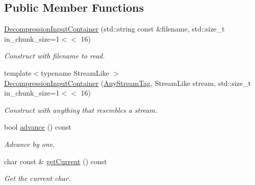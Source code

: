 \subsection*{Public Member Functions}
\begin{DoxyCompactItemize}
\item 
\hyperlink{structvt_1_1util_1_1json_1_1_decompression_input_container_a5cfd1790238964e47e7292ed1ec40548}{Decompression\+Input\+Container} (std\+::string const \&filename, std\+::size\+\_\+t in\+\_\+chunk\+\_\+size=1$<$$<$ 16)
\begin{DoxyCompactList}\small\item\em Construct with filename to read. \end{DoxyCompactList}\item 
{\footnotesize template$<$typename Stream\+Like $>$ }\\\hyperlink{structvt_1_1util_1_1json_1_1_decompression_input_container_a52e3c1f7f8344a77adab88a29251c984}{Decompression\+Input\+Container} (\hyperlink{structvt_1_1util_1_1json_1_1_decompression_input_container_1_1_any_stream_tag}{Any\+Stream\+Tag}, Stream\+Like stream, std\+::size\+\_\+t in\+\_\+chunk\+\_\+size=1$<$$<$ 16)
\begin{DoxyCompactList}\small\item\em Construct with anything that resembles a stream. \end{DoxyCompactList}\item 
bool \hyperlink{structvt_1_1util_1_1json_1_1_decompression_input_container_a7c602c87bed6ca42c1bb2e0a969a922e}{advance} () const
\begin{DoxyCompactList}\small\item\em Advance by one. \end{DoxyCompactList}\item 
char const  \& \hyperlink{structvt_1_1util_1_1json_1_1_decompression_input_container_a05e4f427b7fa0e0b178f74d3c5fc74ce}{get\+Current} () const
\begin{DoxyCompactList}\small\item\em Get the current char. \end{DoxyCompactList}\end{DoxyCompactItemize}
